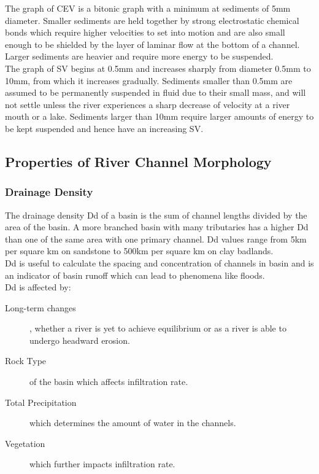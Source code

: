 \documentclass[../../main]{subfiles}
\begin{document}
	The graph of CEV is a bitonic graph with a minimum at sediments of 5mm diameter. Smaller sediments are held together by strong electrostatic chemical bonds which require higher velocities to set into motion and are also small enough to be shielded by the layer of laminar flow at the bottom of a channel. Larger sediments are heavier and require more energy to be suspended. \\

	The graph of SV begins at 0.5mm and increases sharply from diameter 0.5mm to 10mm, from which it increases gradually. Sediments smaller than 0.5mm are assumed to be permanently suspended in fluid due to their small mass, and will not settle unless the river experiences a sharp decrease of velocity at a river mouth or a lake. Sediments larger than 10mm require larger amounts of energy to be kept suspended and hence have an increasing SV.

\subsection{Properties of River Channel Morphology}

\subsubsection{Drainage Density}

	The drainage density Dd of a basin is the sum of channel lengths divided by the area of the basin. A more branched basin with many tributaries has a higher Dd than one of the same area with one primary channel. Dd values range from 5km per square km on sandstone to 500km per square km on clay badlands. \\

	Dd is useful to calculate the spacing and concentration of channels in basin and is an indicator of basin runoff which can lead to phenomena like floods. \\

	Dd is affected by:

	\begin{description}
		\item[Long-term changes] , whether a river is yet to achieve equilibrium or as a river is able to undergo headward erosion.
		\item[Rock Type] of the basin which affects infiltration rate.
		\item[Total Precipitation] which determines the amount of water in the channels.
		\item[Vegetation] which further impacts infiltration rate.
	\end{description}
\end{document}
